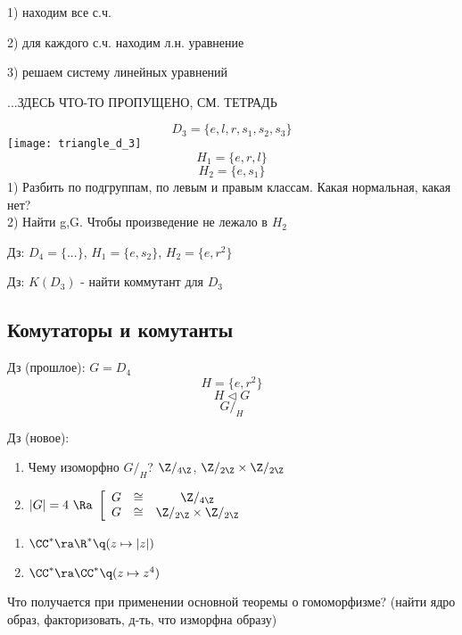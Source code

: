 \documentclass[12pt, fleqn]{article}
\begin{document}
    1) находим все с.ч.

    2) для каждого с.ч. находим л.н. уравнение

    3) решаем систему линейных уравнений

    ...ЗДЕСЬ ЧТО-ТО ПРОПУЩЕНО, СМ. ТЕТРАДЬ

    \begin{Example}
        \[D_3=\{e,l,r,s_1,s_2,s_3\}\]
        \texttt{[image: triangle\_d\_3]}
        \[H_1=\{e,r,l\}\]
        \[H_2=\{e,s_1\}\]
        1) Разбить по подгруппам, по левым и правым классам. Какая нормальная, какая нет?\\
        2) Найти g,G. Чтобы произведение не лежало в $H_2$
    \end{Example}

    Дз: $D_4=\{...\}$, $H_1=\{e,s_2\}$, $H_2=\{e, r^2\}$

    Дз: $K(D_3)$ - найти коммутант для $D_3$

    \subsection{Комутаторы и комутанты}

    \begin{example}
      Дз (прошлое): $G=D_4$
      \[H=\{e,r^2\}\]
      \[H \triangleleft G\]
      \[G/_H\]
    \end{example}

    Дз (новое):
    \begin{enumerate}
      \item Чему изоморфно $G/_H$? $\Z/_{4 \Z}$, $\Z/_{2 \Z} \times \Z/_{2 \Z}$
      \item $|G|=4 \ \Ra \
      \left[
      \begin{array}{ccc}
         G & \cong & \Z/_{4 \Z} \\
         G & \cong & \Z/_{2 \Z} \times \Z/_{2 \Z} \\
      \end{array}
    \right.$
    \end{enumerate}

    \begin{example}

    \end{example}

    \begin{example}
      \begin{enumerate}
        \item $\CC^* \ra \R^* \q (z \mapsto |z|)$
        \item $\CC^* \ra \CC^* \q (z \mapsto z^4)$

      \end{enumerate}
      Что получается при применении основной теоремы о гомоморфизме? (найти ядро образ, факторизовать, д-ть, что изморфна образу)
    \end{example}
\end{document}
